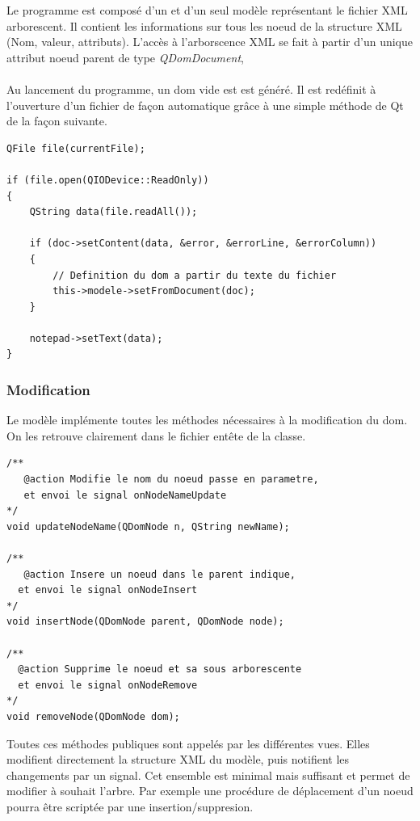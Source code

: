 Le programme est composé d'un et d'un seul modèle représentant le fichier XML arborescent.
Il contient les informations sur tous les noeud de la structure XML (Nom, valeur, attributs).
L'accès à l'arborscence XML se fait à partir d'un unique attribut noeud parent de type \emph{QDomDocument}, 

\paragraph{}
Au lancement du programme, un dom vide est est généré. Il est redéfinit à l'ouverture d'un fichier de façon automatique grâce à une simple méthode de Qt de la façon suivante.

\begin{lstlisting}
QFile file(currentFile);

if (file.open(QIODevice::ReadOnly))
{
    QString data(file.readAll());

    if (doc->setContent(data, &error, &errorLine, &errorColumn))
    {
        // Definition du dom a partir du texte du fichier
        this->modele->setFromDocument(doc);
    }

    notepad->setText(data);
}
\end{lstlisting}

\subsubsection{Modification}

Le modèle implémente toutes les méthodes nécessaires à la modification du dom. On les retrouve clairement dans le fichier entête de la classe.


\begin{lstlisting}
/**
   @action Modifie le nom du noeud passe en parametre,
   et envoi le signal onNodeNameUpdate
*/
void updateNodeName(QDomNode n, QString newName);

/**
   @action Insere un noeud dans le parent indique,
  et envoi le signal onNodeInsert
*/
void insertNode(QDomNode parent, QDomNode node);

/**
  @action Supprime le noeud et sa sous arborescente
  et envoi le signal onNodeRemove
*/
void removeNode(QDomNode dom);
\end{lstlisting}

Toutes ces méthodes publiques sont appelés par les différentes vues.
Elles modifient directement la structure XML du modèle, puis notifient les changements par un signal.
Cet ensemble est minimal mais suffisant et permet de modifier à souhait l'arbre.
Par exemple une procédure de déplacement d'un noeud pourra être scriptée par une insertion/suppresion.

